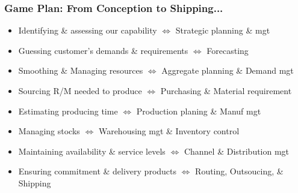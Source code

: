 \documentclass[10pt,handout,notes=show]{beamer}
\begin{document}
\begin{frame}
  \frametitle{Game Plan: From Conception to Shipping...}


  \begin{itemize}
    \item Identifying \& assessing our \alert{capability} $\Longleftrightarrow$ Strategic planning \& mgt
    \item Guessing customer's \alert{demands} \& \alert{requirements} $\Longleftrightarrow$ Forecasting
    \item Smoothing \& Managing \alert{resources} $\Longleftrightarrow$ Aggregate planning \& Demand mgt
    \item \alert{Sourcing} R/M needed to produce $\Longleftrightarrow$ Purchasing \& Material requirement
    \item<2- |handout:1> Estimating \alert{producing time} $\Longleftrightarrow$ Production planing \& Manuf mgt
    \item<2- |handout:1> Managing \alert{stocks}  $\Longleftrightarrow$ Warehousing mgt \& Inventory control
    \item<2- |handout:1> Maintaining availability \& service levels $\Longleftrightarrow$ Channel \& Distribution mgt
    \item<2- |handout:1> Ensuring commitment \& \alert{delivery} products $\Longleftrightarrow$ Routing, Outsoucing, \& Shipping
  \end{itemize}

\end{frame}
\end{document}
